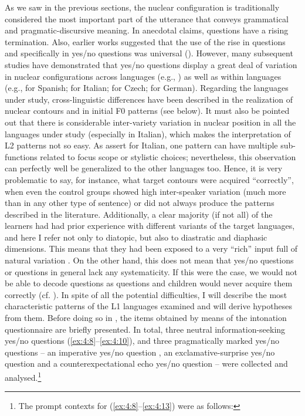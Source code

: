 As we saw in the previous sections, the nuclear configuration is traditionally considered the most important part of the utterance that conveys grammatical and pragmatic-discursive meaning. In anecdotal claims, questions have a rising termination. Also, earlier works suggested that the use of the rise in questions and specifically in yes/no questions was universal (\cites[314]{Bolinger1972b}[155--156]{Cruttenden1997}). However, many subsequent studies have demonstrated that yes/no questions display a great deal of variation in nuclear configurations across languages (e.g., \citealt{Gussenhoven2004, Ladd2008, FrotaPrieto2015}) as well as within languages (e.g.,  \citealt{FernándezRamírez1957-1959, Sosa1999, PrietoRoseano2010} for Spanish; \citealt{GiliFivelaEtAl2015} for Italian; \citealt{PeškováForthcoming} for Czech; \citealt{Gilles2001,Gilles2005, Peters2006} for German). Regarding the languages under study, cross-linguistic differences have been described in the realization of nuclear contours and in initial F0 patterns (see below). It must also be pointed out that there is considerable inter-variety variation in nuclear position in all the languages under study (especially in Italian), which makes the interpretation of L2 patterns not so easy. As  \citet[166]{GiliFivelaEtAl2015} assert for Italian, one pattern can have multiple sub-functions related to focus scope or stylistic choices; nevertheless, this observation can perfectly well be generalized to the other languages too. Hence, it is very problematic to say, for instance, what target contours were acquired “correctly”, when even the control groups showed high inter-speaker variation (much more than in any other type of sentence) or did not always produce the patterns described in the literature. Additionally, a clear majority (if not all) of the learners had had prior experience with different variants of the target languages, and here I refer not only to diatopic, but also to diastratic and diaphasic dimensions. This means that they had been exposed to a very “rich” input full of natural variation . On the other hand, this does not mean that yes/no questions or questions in general lack any systematicity. If this were the case, we would not be able to decode questions as questions and children would never acquire them correctly (cf. \citealt[62]{Daneš1949}). In spite of all the potential difficulties, I will describe the most characteristic patterns of the L1 languages examined and will derive hypotheses from them. Before doing so in , the items obtained by means of the intonation questionnaire are briefly presented. In total, three neutral information-seeking yes/no questions (\ref{ex:4:8}--\ref{ex:4:10}), and three pragmatically marked yes/no questions -- an imperative yes/no question , an exclamative-surprise yes/no question  and a counterexpectational echo yes/no question  -- were collected and analysed.\footnote{The prompt contexts for (\ref{ex:4:8}--\ref{ex:4:13}) were as follows:
}
